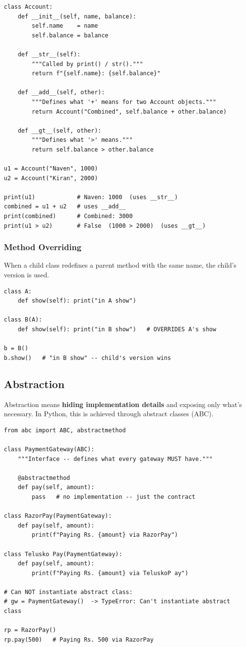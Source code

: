 \documentclass[12pt,a4paper]{article}
\begin{document}
\begin{lstlisting}
class Account:
    def __init__(self, name, balance):
        self.name    = name
        self.balance = balance

    def __str__(self):
        """Called by print() / str()."""
        return f"{self.name}: {self.balance}"

    def __add__(self, other):
        """Defines what '+' means for two Account objects."""
        return Account("Combined", self.balance + other.balance)

    def __gt__(self, other):
        """Defines what '>' means."""
        return self.balance > other.balance

u1 = Account("Naven", 1000)
u2 = Account("Kiran", 2000)

print(u1)            # Naven: 1000  (uses __str__)
combined = u1 + u2   # uses __add__
print(combined)      # Combined: 3000
print(u1 > u2)       # False  (1000 > 2000)  (uses __gt__)
\end{lstlisting}

\subsubsection{Method Overriding}

When a child class redefines a parent method with the same name, the child's version is used.

\begin{lstlisting}
class A:
    def show(self): print("in A show")

class B(A):
    def show(self): print("in B show")   # OVERRIDES A's show

b = B()
b.show()   # "in B show" -- child's version wins
\end{lstlisting}

\subsection{Abstraction}

Abstraction means \textbf{hiding implementation details} and exposing only what's necessary. In Python, this is achieved through abstract classes (ABC).

\begin{lstlisting}
from abc import ABC, abstractmethod

class PaymentGateway(ABC):
    """Interface -- defines what every gateway MUST have."""

    @abstractmethod
    def pay(self, amount):
        pass   # no implementation -- just the contract

class RazorPay(PaymentGateway):
    def pay(self, amount):
        print(f"Paying Rs. {amount} via RazorPay")

class Telusko Pay(PaymentGateway):
    def pay(self, amount):
        print(f"Paying Rs. {amount} via TeluskoP ay")

# Can NOT instantiate abstract class:
# gw = PaymentGateway()  -> TypeError: Can't instantiate abstract class

rp = RazorPay()
rp.pay(500)   # Paying Rs. 500 via RazorPay
\end{lstlisting}
\end{document}
